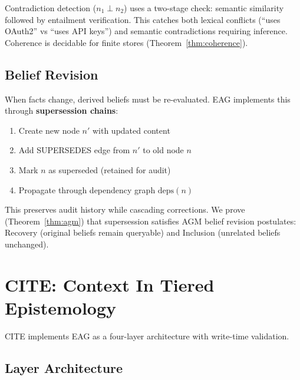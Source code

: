 \documentclass[11pt,letterpaper]{article}
\begin{document}
Contradiction detection ($n_1 \perp n_2$) uses a two-stage check: semantic similarity followed by entailment verification. This catches both lexical conflicts (``uses OAuth2'' vs ``uses API keys'') and semantic contradictions requiring inference. Coherence is decidable for finite stores (Theorem~\ref{thm:coherence}).

\subsection{Belief Revision}

When facts change, derived beliefs must be re-evaluated. EAG implements this through \textbf{supersession chains}:

\begin{enumerate}[noitemsep]
    \item Create new node $n'$ with updated content
    \item Add SUPERSEDES edge from $n'$ to old node $n$
    \item Mark $n$ as superseded (retained for audit)
    \item Propagate through dependency graph $\text{deps}(n)$
\end{enumerate}

This preserves audit history while cascading corrections. We prove (Theorem~\ref{thm:agm}) that supersession satisfies AGM belief revision postulates: Recovery (original beliefs remain queryable) and Inclusion (unrelated beliefs unchanged).

\section{CITE: Context In Tiered Epistemology}
\label{sec:cite}

CITE implements EAG as a four-layer architecture with write-time validation.

\subsection{Layer Architecture}
\end{document}
